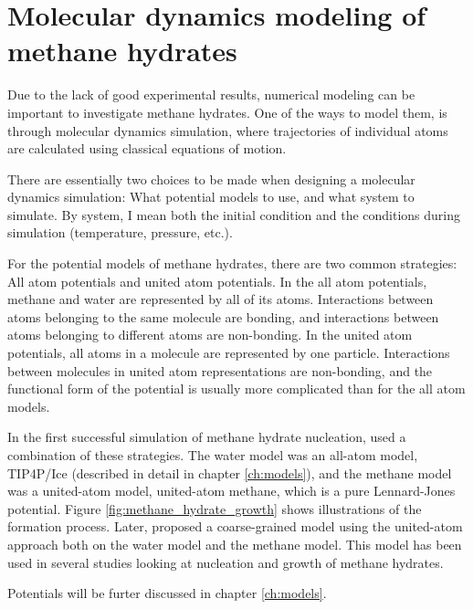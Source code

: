 \section{Molecular dynamics modeling of methane hydrates}
Due to the lack of good experimental results, numerical modeling can be important to investigate methane hydrates. One of the ways to model them, is through molecular dynamics simulation, where trajectories of individual atoms are calculated using classical equations of motion. 

There are essentially two choices to be made when designing a molecular dynamics simulation: What potential models to use, and what system to simulate. By system, I mean both the initial condition and the conditions during simulation (temperature, pressure, etc.).

For the potential models of methane hydrates, there are two common strategies: All atom potentials and united atom potentials. In the all atom potentials, methane and water are represented by all of its atoms. Interactions between atoms belonging to the same molecule are bonding, and interactions between atoms belonging to different atoms are non-bonding. In the united atom potentials, all atoms in a molecule are represented by one particle. Interactions between molecules in united atom representations are non-bonding, and the functional form of the potential is usually more complicated than for the all atom models. 

In the first successful simulation of methane hydrate nucleation, \citet{Walsh2009} used a combination of these strategies. The water model was an all-atom model, TIP4P/Ice (described in detail in chapter \ref{ch:models}), and the methane model was a united-atom model, united-atom methane, which is a pure Lennard-Jones potential. Figure \ref{fig:methane_hydrate_growth} shows illustrations of the formation process.  Later, \citet{Jacobson2010b} proposed a coarse-grained model using the united-atom approach both on the water model and the methane model. This model has been used in several studies looking at nucleation and growth of methane hydrates. 

Potentials will be furter discussed in chapter \ref{ch:models}.

